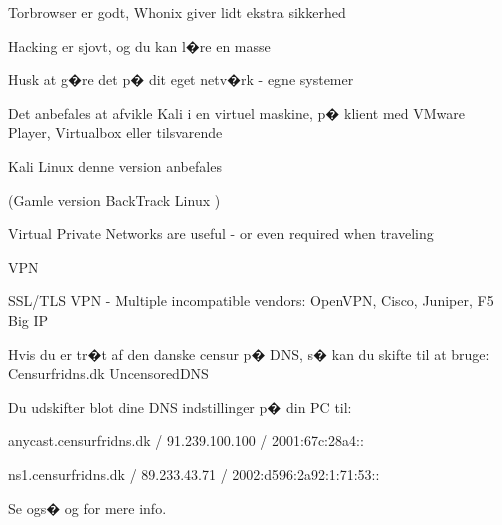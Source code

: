 \documentclass[20pt,landscape,a4paper,footrule]{foils}
\begin{document}
\centerline{Torbrowser er godt, Whonix giver lidt ekstra sikkerhed}








\begin{list1}
\item Hacking er sjovt, og du kan l�re en masse
\item Husk at g�re det p� dit eget netv�rk - egne systemer
\item Det anbefales at afvikle Kali i en virtuel maskine, p� klient med VMware Player, Virtualbox eller tilsvarende
\item Kali Linux  denne version anbefales
\item (Gamle version BackTrack Linux )
\end{list1}




\begin{list1}
\item Virtual Private Networks are useful - or even required when traveling
\item VPN 
\item SSL/TLS VPN - Multiple incompatible vendors: OpenVPN, Cisco, Juniper, F5 Big IP
\end{list1}




Hvis du er tr�t af den danske censur p� DNS, s� kan du skifte til at bruge:
Censurfridns.dk UncensoredDNS

Du udskifter blot dine DNS indstillinger p� din PC til:
\begin{list2}
	\item anycast.censurfridns.dk / 91.239.100.100 / 2001:67c:28a4::
	\item ns1.censurfridns.dk / 89.233.43.71 / 2002:d596:2a92:1:71:53::
\end{list2}
Se ogs�  og  for mere info.

\vskip 2cm
\end{document}
